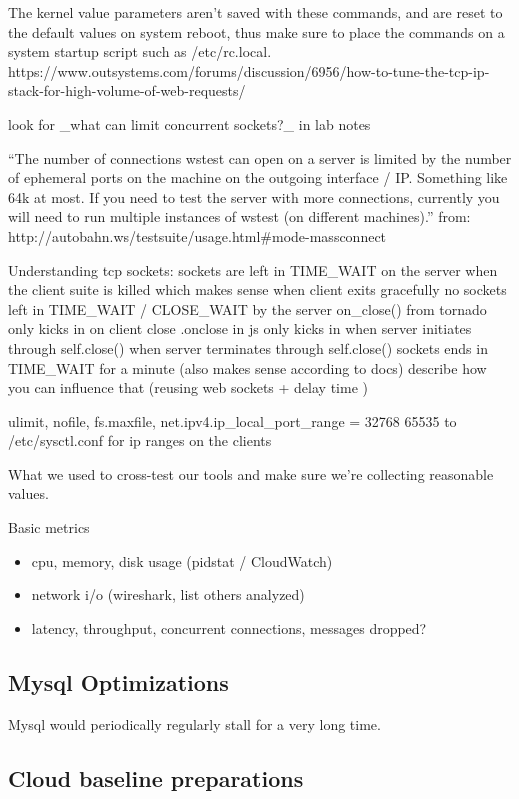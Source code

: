 \documentclass{uvamscse}
\begin{document}
The kernel value parameters aren't saved with these commands, and are reset to the default values on system reboot, thus make sure to place the commands on a system startup script such as /etc/rc.local.
https://www.outsystems.com/forums/discussion/6956/how-to-tune-the-tcp-ip-stack-for-high-volume-of-web-requests/

look for \_what can limit concurrent sockets?\_ in lab notes

“The number of connections wstest can open on a server is limited by the number of ephemeral ports on the machine on the outgoing interface / IP. Something like 64k at most. If you need to test the server with more connections, currently you will need to run multiple instances of wstest (on different machines).” from: http://autobahn.ws/testsuite/usage.html\#mode-massconnect

Understanding tcp sockets:
sockets are left in TIME\_WAIT on the server when the client suite is killed which makes sense
when client exits gracefully no sockets left in TIME\_WAIT / CLOSE\_WAIT by the server
on\_close() from tornado only kicks in on client close
.onclose in js only kicks in when server initiates through self.close()
when server terminates through self.close() sockets ends in TIME\_WAIT for a minute (also makes sense according to docs)
describe how you can influence that (reusing web sockets + delay time )

ulimit, nofile, fs.max\-file, net.ipv4.ip\_local\_port\_range = 32768 65535  to /etc/sysctl.conf for ip ranges on the clients

What we used to cross-test our tools and make sure we're collecting reasonable values.

Basic metrics
\begin{itemize}
  \item cpu, memory, disk usage (pidstat / CloudWatch)
  \item network i/o (wireshark, list others analyzed)
  \item latency, throughput, concurrent connections, messages dropped?
\end{itemize}

\subsection{Mysql Optimizations}
Mysql would periodically regularly stall for a very long time.

\subsection{Cloud baseline preparations}
\end{document}
